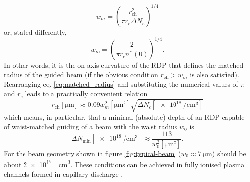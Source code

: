 \documentclass[../main.tex]{subfiles}
\begin{document}
\begin{equation}
    w_m=\left( \frac{r_\text{ch}^2}{\pi r_e \Delta N_e}\right)^{1/4}
    \label{eq:matched_radius}
\end{equation}
or, stated differently,
\begin{equation}
    w_m=\left( \frac{2}{\pi r_e n^{\prime\prime}(0)}\right)^{1/4}.
\end{equation}
In other words, it is the on-axis curvature of the RDP that defines the matched radius of the guided beam (if the obvious condition $r_\text{ch}>w_m$ is also satisfied).
Rearranging eq. \ref{eq:matched_radius} and substituting the numerical values of $\pi$ and $r_e$ leads to a practically convenient relation
\begin{equation}
    r_\text{ch}\left[\si{\um}\right]\approx0.09 w_m^2\left[\si{\square\um}\right]\sqrt{\Delta N_e\left[\SI{e18}{\per\cubic\cm}\right]}
\end{equation}
which means, in particular, that a minimal (absolute) depth of an RDP capable of waist-matched guiding of a beam with the waist radius $w_0$ is
\begin{equation}
\Delta N_\text{min}\left[\SI{e18}{\per\cubic\cm}\right]\approx\frac{113}{w_0^2\left[\si{\square\um}\right]}.
\end{equation}
For the beam geometry shown in figure \ref{fig:typical-beam} ($w_0\approx\SI{7}{\um}$) should be about \SI{2e17}{\per\cubic\cm}. %
These conditions can be achieved in fully ionised plasma channels formed in capillary discharge  \cite{Butler2002GuidingWaveguide,Ehrlich1996GuidingExperiments}.





\end{document}
